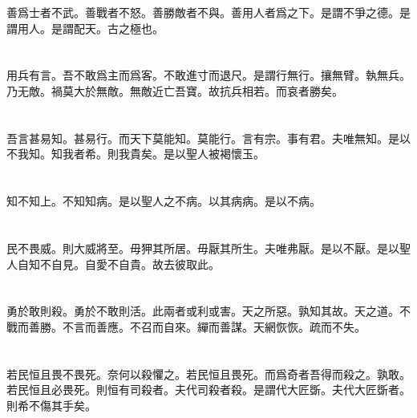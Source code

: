 \documentclass[a5paper]{ctexbook}
\begin{document}
    善爲士者不武。善戰者不怒。善勝敵者不與。善用人者爲之下。是謂不爭之德。是謂用人。是謂配天。古之極也。

    \chapter{}

    用兵有言。吾不敢爲主而爲客。不敢進寸而退尺。是謂行無行。攘無臂。執無兵。乃无敵。禍莫大於無敵。無敵近亡吾寶。故抗兵相若。而哀者勝矣。

    \chapter{}

    吾言甚易知。甚易行。而天下莫能知。莫能行。言有宗。事有君。夫唯無知。是以不我知。知我者希。則我貴矣。是以聖人被褐懷玉。

    \chapter{}

    知不知上。不知知病。是以聖人之不病。以其病病。是以不病。

    \chapter{}

    民不畏威。則大威將至。毋狎其所居。毋厭其所生。夫唯弗厭。是以不厭。是以聖人自知不自見。自愛不自貴。故去彼取此。

    \chapter{}

    勇於敢則殺。勇於不敢則活。此兩者或利或害。天之所惡。孰知其故。天之道。不戰而善勝。不言而善應。不召而自來。繟而善謀。天網恢恢。疏而不失。

    \chapter{}

    若民恒且畏不畏死。奈何以殺懼之。若民恒且畏死。而爲奇者吾得而殺之。孰敢。若民恒且必畏死。則恒有司殺者。夫代司殺者殺。是謂代大匠斲。夫代大匠斲者。則希不傷其手矣。

    \chapter{}
\end{document}
